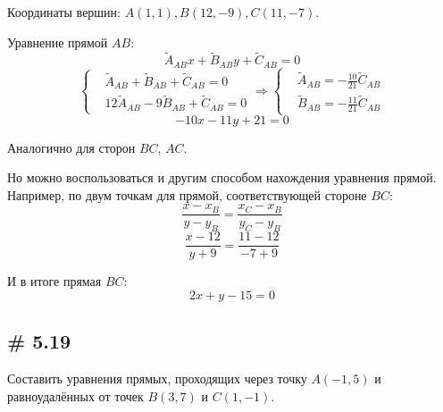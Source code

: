 \documentclass[a4paper,12pt]{article}
\begin{document}
\begin{solution}
    Координаты вершин: $A(1, 1), B(12, -9), C(11, -7)$.
    
    Уравнение прямой $AB$:
    \[
      \widetilde A_{AB} x + \widetilde B_{AB} y + \widetilde C_{AB} = 0
    \]
    \[
      \left\{
        \begin{aligned}
          &\widetilde A_{AB} + \widetilde B_{AB} + \widetilde C_{AB} = 0\\
          &12 \widetilde A_{AB} -9 \widetilde B_{AB} + \widetilde C_{AB} = 0
        \end{aligned}
      \right.
      \Rightarrow
      \left\{
        \begin{aligned}
          &\widetilde A_{AB} = -\frac{10}{21}\widetilde C_{AB}\\
          &\widetilde B_{AB} = -\frac{11}{21}\widetilde C_{AB}
        \end{aligned}
      \right.
    \]
    \[
      -10x - 11y + 21 = 0
    \]
    
    Аналогично для сторон $BC$, $AC$.
    
    Но можно воспользоваться и другим способом нахождения уравнения прямой.
    Например, по двум точкам для прямой, соответствующей стороне $BC$:
    \[
      \frac{x - x_B}{y - y_B} = \frac{x_C - x_B}{y_C - y_B}
    \]
    \[
      \frac{x - 12}{y + 9} = \frac{11 - 12}{-7 + 9}
    \]
    
    И в итоге прямая $BC$:
    \[
      2x + y - 15 = 0
    \]
  \end{solution}
  
  
  \subsection{\# 5.19}
  
  \begin{problem}
    Составить уравнения прямых, проходящих через точку $A(-1, 5)$ и равноудалённых от точек $B(3, 7)$ и $C(1, -1)$.
  \end{problem}
  
\end{document}
